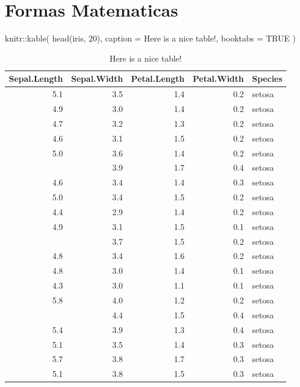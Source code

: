 \documentclass[
  16pt,
]{krantz}
\newenvironment{Shaded}{\begin{snugshade}}{\end{snugshade}}
\newcommand{\AttributeTok}[1]{\textcolor[rgb]{0.77,0.63,0.00}{#1}}
\newcommand{\ConstantTok}[1]{\textcolor[rgb]{0.00,0.00,0.00}{#1}}
\newcommand{\DecValTok}[1]{\textcolor[rgb]{0.00,0.00,0.81}{#1}}
\newcommand{\FunctionTok}[1]{\textcolor[rgb]{0.00,0.00,0.00}{#1}}
\newcommand{\NormalTok}[1]{#1}
\newcommand{\SpecialCharTok}[1]{\textcolor[rgb]{0.00,0.00,0.00}{#1}}
\newcommand{\StringTok}[1]{\textcolor[rgb]{0.31,0.60,0.02}{#1}}
\theoremstyle{definition}
\theoremstyle{definition}
\theoremstyle{definition}
\theoremstyle{definition}
\theoremstyle{remark}
\begin{document}
\hypertarget{formas-matematicas}{%
\chapter{Formas Matematicas}\label{formas-matematicas}}

\begin{Shaded}
\begin{Highlighting}[]
\NormalTok{knitr}\SpecialCharTok{::}\FunctionTok{kable}\NormalTok{(}
  \FunctionTok{head}\NormalTok{(iris, }\DecValTok{20}\NormalTok{), }\AttributeTok{caption =} \StringTok{\textquotesingle{}Here is a nice table!\textquotesingle{}}\NormalTok{,}
  \AttributeTok{booktabs =} \ConstantTok{TRUE}
\NormalTok{)}
\end{Highlighting}
\end{Shaded}

\begin{table}

\caption{\label{tab:nice-tab}Here is a nice table!}
\centering
\begin{tabular}[t]{rrrrl}
\toprule
Sepal.Length & Sepal.Width & Petal.Length & Petal.Width & Species\\
\midrule
5.1 & 3.5 & 1.4 & 0.2 & setosa\\
4.9 & 3.0 & 1.4 & 0.2 & setosa\\
4.7 & 3.2 & 1.3 & 0.2 & setosa\\
4.6 & 3.1 & 1.5 & 0.2 & setosa\\
5.0 & 3.6 & 1.4 & 0.2 & setosa\\
\addlinespace
5.4 & 3.9 & 1.7 & 0.4 & setosa\\
4.6 & 3.4 & 1.4 & 0.3 & setosa\\
5.0 & 3.4 & 1.5 & 0.2 & setosa\\
4.4 & 2.9 & 1.4 & 0.2 & setosa\\
4.9 & 3.1 & 1.5 & 0.1 & setosa\\
\addlinespace
5.4 & 3.7 & 1.5 & 0.2 & setosa\\
4.8 & 3.4 & 1.6 & 0.2 & setosa\\
4.8 & 3.0 & 1.4 & 0.1 & setosa\\
4.3 & 3.0 & 1.1 & 0.1 & setosa\\
5.8 & 4.0 & 1.2 & 0.2 & setosa\\
\addlinespace
5.7 & 4.4 & 1.5 & 0.4 & setosa\\
5.4 & 3.9 & 1.3 & 0.4 & setosa\\
5.1 & 3.5 & 1.4 & 0.3 & setosa\\
5.7 & 3.8 & 1.7 & 0.3 & setosa\\
5.1 & 3.8 & 1.5 & 0.3 & setosa\\
\bottomrule
\end{tabular}
\end{table}
\end{document}
